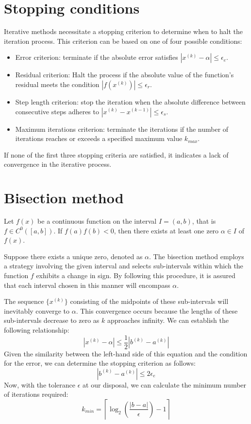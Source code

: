 \documentclass[12pt, a4paper]{report}
\begin{document}
    \section{Stopping conditions}
    Iterative methods necessitate a stopping criterion to determine when to halt the iteration process. 
    This criterion can be based on one of four possible conditions:
    \begin{itemize}
        \item Error criterion: terminate if the absolute error satisfies $\left\lvert x^{(k)}-\alpha \right\rvert \leq \epsilon_e$.
        \item Residual criterion: Halt the process if the absolute value of the function's residual meets the condition $\left\lvert f\left(x^{(k)}\right) \right\rvert \leq \epsilon_r$. 
        \item Step length criterion: stop the iteration when the absolute difference between consecutive steps adheres to $\left\lvert x^{(k)}-x^{(k-1)} \right\rvert \leq \epsilon_s$. 
        \item Maximum iterations criterion: terminate the iterations if the number of iterations reaches or exceeds a specified maximum value $k_{max}$. 
    \end{itemize}
    If none of the first three stopping criteria are satisfied, it indicates a lack of convergence in the iterative process.

    \newpage
    \section{Bisection method}
    \begin{theorem}
        Let $f(x)$ be a continuous function on the interval $I=(a,b)$, that is $f \in C^0([a,b])$. 
        If $f(a)f(b)<0$, then there exists at least one zero $\alpha \in I$ of $f(x)$. 
    \end{theorem}
    Suppose there exists a unique zero, denoted as $\alpha$. 
    The bisection method employs a strategy involving the given interval and selects sub-intervals within which the function $f$ exhibits a change in sign.
    By following this procedure, it is assured that each interval chosen in this manner will encompass $\alpha$. 
    
    The sequence $\{x^{(k)}\}$ consisting of the midpoints of these sub-intervals will inevitably converge to $\alpha$. 
    This convergence occurs because the lengths of these sub-intervals decrease to zero as $k$ approaches infinity.
    We can establish the following relationship:
    \[\left\lvert x^{(k)} - \alpha \right\rvert \leq \dfrac{1}{2} \left\lvert b^{(k)}-a^{(k)} \right\rvert \]
    Given the similarity between the left-hand side of this equation and the condition for the error, we can determine the stopping criterion as follows:
    \[\left\lvert b^{(k)}-a^{(k)} \right\rvert \leq 2 \epsilon_e\]
    Now, with the tolerance $\epsilon$ at our disposal, we can calculate the minimum number of iterations required:
    \[k_{min}= \left\lceil {\log_2{\left( \dfrac{\left\lvert b-a \right\rvert}{\epsilon} \right)}-1}\right\rceil\]
\end{document}
